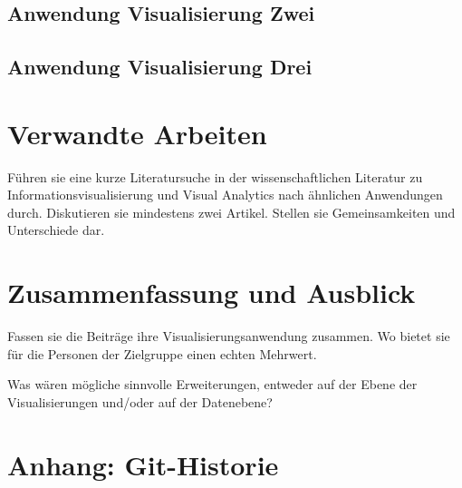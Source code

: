 \documentclass[usegeometry=true]{scrartcl}
\begin{document}
\subsection{Anwendung Visualisierung Zwei}
\label{AnwZwei}
\subsection{Anwendung Visualisierung Drei}
\label{AnwDrei}

\section{Verwandte Arbeiten}
Führen sie eine kurze Literatursuche in der wissenschaftlichen Literatur zu Informationsvisualisierung und Visual Analytics nach ähnlichen Anwendungen durch. Diskutieren sie mindestens zwei Artikel. Stellen sie Gemeinsamkeiten und Unterschiede dar.

\section{Zusammenfassung und Ausblick}
Fassen sie die Beiträge ihre Visualisierungsanwendung zusammen. Wo bietet sie für die Personen der Zielgruppe einen echten Mehrwert.

Was wären mögliche sinnvolle Erweiterungen, entweder auf der Ebene der Visualisierungen und/oder auf der Datenebene?

\section*{Anhang: Git-Historie}

\printbibliography
\end{document}
